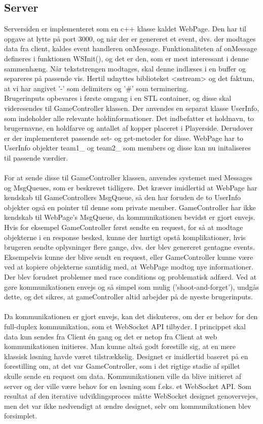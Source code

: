 \documentclass[Softwaredesign/Softwaredesign_main.tex]{subfiles}
\begin{document}
\subsection{Server}\label{server_doc}
Serversiden er implementeret som en c++ klasse kaldet WebPage. Den har til opgave at lytte på port 3000, og når der er genereret et event, dvs. der modtages data fra client, kaldes event handleren onMessage. Funktionaliteten af onMessage defineres i funktionen WSInit(), og det er den, som er mest interessant i denne sammenhæng. Når tekststrengen modtages, skal denne indlæses i en buffer og separeres på passende vis. Hertil udnyttes biblioteket <sstream> og det faktum, at vi har angivet '-' som delimiters og '\#' som terminering.\cite{tokenize} \\Brugerinputs opbevares i første omgang i en STL container, og disse skal videresendes til GameController klassen. Der anvendes en separat klasse UserInfo, som indeholder alle relevante holdinformationer. Det indbefatter et holdnavn, to brugernavne, en holdfarve og antallet af kopper placeret i Playerside. Derudover er der implementeret passende set- og get-metoder for disse. WebPage har to UserInfo objekter team1\_ og team2\_ som members og disse kan nu initaliseres til passende værdier. \\\\For at sende disse til GameController klassen, anvendes systemet med Messages og MsgQueues, som er beskrevet tidligere. Det kræver imidlertid at WebPage har kendskab til GameControllers MsgQueue, så den har foruden de to UserInfo objekter også en pointer til denne som private member. GameController har ikke kendskab til WebPage's MsgQueue, da kommunikationen bevidst er gjort envejs. Hvis for eksempel GameController først sendte en request, for så at modtage objekterne i en response besked, kunne der hurtigt opstå komplikationer, hvis brugeren sendte oplysninger flere gange, dvs. der blev genereret gentagne events. Eksempelvis kunne der blive sendt en request, eller GameController kunne være ved at kopiere objekterne samtidig med, at WebPage modtog nye informationer. Der blev forudset problemer med race conditions og problematisk adfærd. Ved at gøre kommunikationen envejs og så simpel som mulig ('shoot-and-forget'), undgås dette, og det sikres, at gameController altid arbejder på de nyeste brugerinputs.\\\\Da kommunikationen er gjort envejs, kan det diskuteres, om der er behov for den full-duplex kommunikation, som et WebSocket API tilbyder. I princippet skal data kun sendes fra Client én gang og det er netop fra Client at web kommunikationen initieres. Man kunne altså godt forestille sig, at en mere klassisk løsning havde været tilstrækkelig. Designet er imidlertid baseret på en forestilling om, at det var GameController, som i det rigtige stadie af spillet skulle sende en request om data. Kommunikationen ville da blive initieret af server og der ville være behov for en løsning som f.eks. et WebSocket API. Som resultat af den iterative udviklingsproces måtte WebSocket designet genovervejes, men det var ikke nødvendigt at ændre designet, selv om kommunikationen blev forsimplet. 
\end{document}
